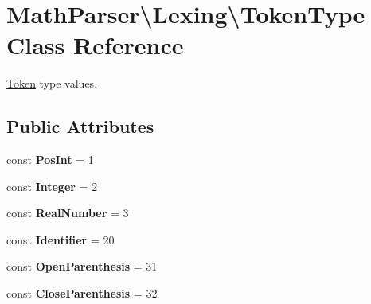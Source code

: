 \hypertarget{classMathParser_1_1Lexing_1_1TokenType}{\section{Math\-Parser\textbackslash{}Lexing\textbackslash{}Token\-Type Class Reference}
\label{classMathParser_1_1Lexing_1_1TokenType}
}


\hyperlink{classMathParser_1_1Lexing_1_1Token}{Token} type values.  


\subsection*{Public Attributes}
\begin{DoxyCompactItemize}
\item 
\hypertarget{classMathParser_1_1Lexing_1_1TokenType_a7312d065593448cb9e873b1d88132749}{const {\bfseries Pos\-Int} = 1}\label{classMathParser_1_1Lexing_1_1TokenType_a7312d065593448cb9e873b1d88132749}

\item 
\hypertarget{classMathParser_1_1Lexing_1_1TokenType_ab73ffac04a5eebc22494de06a1b1a51d}{const {\bfseries Integer} = 2}\label{classMathParser_1_1Lexing_1_1TokenType_ab73ffac04a5eebc22494de06a1b1a51d}

\item 
\hypertarget{classMathParser_1_1Lexing_1_1TokenType_ab9c1a916bb4cdaf96d30eb97cd83548f}{const {\bfseries Real\-Number} = 3}\label{classMathParser_1_1Lexing_1_1TokenType_ab9c1a916bb4cdaf96d30eb97cd83548f}

\item 
\hypertarget{classMathParser_1_1Lexing_1_1TokenType_a841cc795a663257447d71c9a31e29945}{const {\bfseries Identifier} = 20}\label{classMathParser_1_1Lexing_1_1TokenType_a841cc795a663257447d71c9a31e29945}

\item 
\hypertarget{classMathParser_1_1Lexing_1_1TokenType_a4b2d997bb88448e1a72e43e171cc6c5f}{const {\bfseries Open\-Parenthesis} = 31}\label{classMathParser_1_1Lexing_1_1TokenType_a4b2d997bb88448e1a72e43e171cc6c5f}

\item 
\hypertarget{classMathParser_1_1Lexing_1_1TokenType_ae70cd224de081c16479ead6674f19131}{const {\bfseries Close\-Parenthesis} = 32}\label{classMathParser_1_1Lexing_1_1TokenType_ae70cd224de081c16479ead6674f19131}


\end{DoxyCompactItemize}
